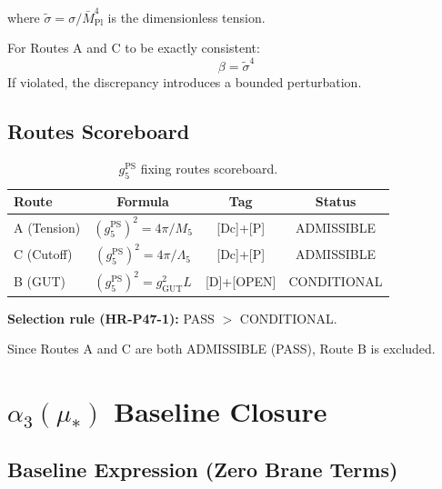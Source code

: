 \documentclass[11pt,a4paper]{article}
\theoremstyle{definition}
\begin{document}
where $\tilde{\sigma} = \sigma/\bar{M}_{\text{Pl}}^4$ is the dimensionless tension.

\begin{invariancebox}
For Routes A and C to be exactly consistent:
\begin{equation}
\label{eq:consistency-constraint}
\boxed{\beta = \tilde{\sigma}^4}
\end{equation}
If violated, the discrepancy introduces a bounded perturbation.
\end{invariancebox}

\subsection{Routes Scoreboard}
\label{subsec:routes-scoreboard}

\begin{table}[ht]
\centering
\caption{$g_5^{\text{PS}}$ fixing routes scoreboard.}
\label{tab:g5-scoreboard}
\begin{tabular}{lccc}
\toprule
Route & Formula & Tag & Status \\
\midrule
A (Tension) & $(g_5^{\text{PS}})^2 = 4\pi / M_5$ & [Dc]+[P] & ADMISSIBLE \\
C (Cutoff) & $(g_5^{\text{PS}})^2 = 4\pi / \Lambda_5$ & [Dc]+[P] & ADMISSIBLE \\
B (GUT) & $(g_5^{\text{PS}})^2 = g_{\text{GUT}}^2 L$ & [D]+[OPEN] & CONDITIONAL \\
\bottomrule
\end{tabular}
\end{table}

\textbf{Selection rule (HR-P47-1):} PASS $>$ CONDITIONAL.

Since Routes A and C are both ADMISSIBLE (PASS), Route B is excluded.

\section{$\alpha_3(\mu_*)$ Baseline Closure}
\label{sec:alpha3-baseline}

\subsection{Baseline Expression (Zero Brane Terms)}
\label{subsec:baseline}
\end{document}
